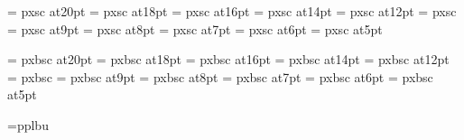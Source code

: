 \font\twentycaps=      pxsc at20pt
\font\eighteencaps=    pxsc at18pt
\font\sixteencaps=     pxsc at16pt
\font\fourteencaps=    pxsc at14pt
\font\twelvecaps=      pxsc at12pt
\font\caps=            pxsc  %
\font\ninecaps=        pxsc at9pt
\font\eightcaps=       pxsc at8pt
\font\sevencaps=       pxsc at7pt
\font\sixcaps=         pxsc at6pt
\font\fivecaps=        pxsc at5pt

\font\twentycapsbf=      pxbsc at20pt
\font\eighteencapsbf=    pxbsc at18pt
\font\sixteencapsbf=     pxbsc at16pt
\font\fourteencapsbf=    pxbsc at14pt
\font\twelvecapsbf=      pxbsc at12pt
\font\capsbf=            pxbsc %
\font\ninecapsbf=        pxbsc at9pt
\font\eightcapsbf=       pxbsc at8pt
\font\sevencapsbf=       pxbsc at7pt
\font\sixcapsbf=         pxbsc at6pt
\font\fivecapsbf=        pxbsc at5pt

\font\handbf=pplbu

\rm 